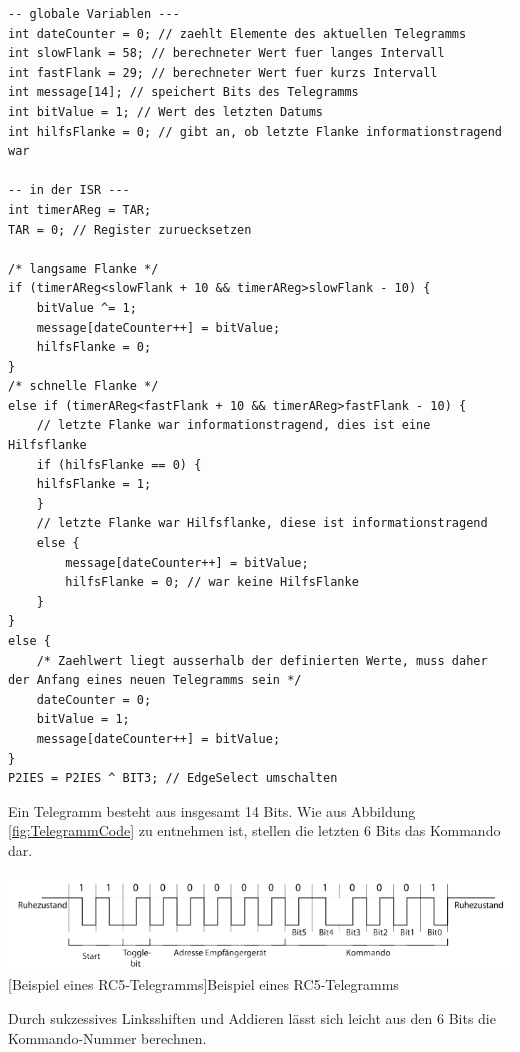 \documentclass[12pt,a4paper,bibliography=totocnumbered,listof=totocnumbered]{scrartcl}
\begin{document}
\vspace{1em}
\begin{lstlisting}[caption=Auswertung des Impulsintervalls]
-- globale Variablen ---
int dateCounter = 0; // zaehlt Elemente des aktuellen Telegramms
int slowFlank = 58; // berechneter Wert fuer langes Intervall
int fastFlank = 29; // berechneter Wert fuer kurzs Intervall
int message[14]; // speichert Bits des Telegramms
int bitValue = 1; // Wert des letzten Datums
int hilfsFlanke = 0; // gibt an, ob letzte Flanke informationstragend war

-- in der ISR --- 
int timerAReg = TAR;
TAR = 0; // Register zuruecksetzen

/* langsame Flanke */
if (timerAReg<slowFlank + 10 && timerAReg>slowFlank - 10) {
	bitValue ^= 1; 
	message[dateCounter++] = bitValue; 
	hilfsFlanke = 0; 
}
/* schnelle Flanke */
else if (timerAReg<fastFlank + 10 && timerAReg>fastFlank - 10) {
	// letzte Flanke war informationstragend, dies ist eine Hilfsflanke
	if (hilfsFlanke == 0) {
	hilfsFlanke = 1;
	}
	// letzte Flanke war Hilfsflanke, diese ist informationstragend
	else {
		message[dateCounter++] = bitValue;
		hilfsFlanke = 0; // war keine HilfsFlanke
	}
}
else {
	/* Zaehlwert liegt ausserhalb der definierten Werte, muss daher der Anfang eines neuen Telegramms sein */
	dateCounter = 0;
	bitValue = 1;
	message[dateCounter++] = bitValue;
}
P2IES = P2IES ^ BIT3; // EdgeSelect umschalten
\end{lstlisting}

Ein Telegramm besteht aus insgesamt 14 Bits. Wie aus Abbildung \ref{fig:TelegrammCode} zu entnehmen ist, stellen die letzten 6 Bits das Kommando dar.



\vspace{1em}
\begin{minipage}{\linewidth}
	\centering
	\includegraphics[width=1.1\linewidth]{img/Telegramm.png}
	[Beispiel eines RC5-Telegramms]{Beispiel eines RC5-Telegramms\footnotemark}
	\label{fig:TelegrammCode}
\end{minipage}

Durch sukzessives Linksshiften und Addieren lässt sich leicht aus den 6 Bits die Kommando-Nummer berechnen.
\end{document}
